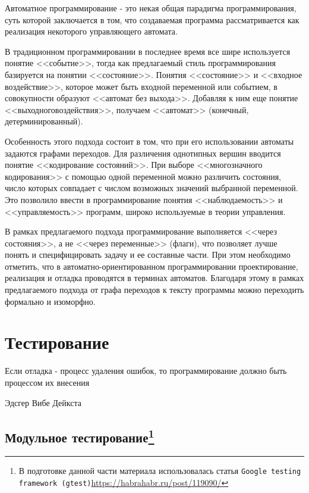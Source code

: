 \documentclass[12pt, twoside]{report}
\begin{document}
Автоматное программирование \cite{Karpov:AutomataLanguage} - это некая общая парадигма программирования, суть которой заключается в том, 
что создаваемая программа рассматривается как реализация некоторого управляющего автомата.

В традиционном программировании в последнее время все шире используется понятие <<событие>>, 
тогда как предлагаемый стиль программирования базируется на понятии <<состояние>>. Понятия 
<<состояние>> и <<входное воздействие>>, которое может быть входной переменной или событием, 
в совокупности образуют <<автомат без выхода>>. Добавляя к ним еще понятие <<выходноговоздействия>>, 
получаем <<автомат>> (конечный, детерминированный)\cite{Shalito:AutomataProgramming2}.

Особенность этого подхода состоит в том, что при его использовании автоматы задаются графами переходов. 
Для различения однотипных вершин вводится понятие <<кодирование состояний>>. При выборе <<многозначного кодирования>> 
с помощью одной переменной можно различить состояния, число которых совпадает с числом возможных значений 
выбранной переменной. Это позволило ввести в программирование понятия <<наблюдаемость>> и <<управляемость>> 
программ, широко используемые в теории управления.

В рамках предлагаемого подхода программирование выполняется <<через состояния>>, а не <<через переменные>> (флаги), 
что позволяет лучше понять и специфицировать задачу и ее составные части. При этом необходимо отметить, 
что в автоматно-ориентированном программировании проектирование, реализация и отладка проводятся в 
терминах автоматов. Благодаря этому в рамках предлагаемого подхода от графа переходов к тексту 
программы можно переходить формально и изоморфно.

\newpage
\chapter*{Тестирование}

\epigraph{Если отладка - процесс удаления ошибок, то программирование должно быть процессом их внесения}{Эдсгер Вибе Дейкста}

\section*{Модульное тестирование\footnote{В подготовке данной части материала использовалась статья \texttt{Google testing framework (gtest)}\url{https://habrahabr.ru/post/119090/}}}
\end{document}
